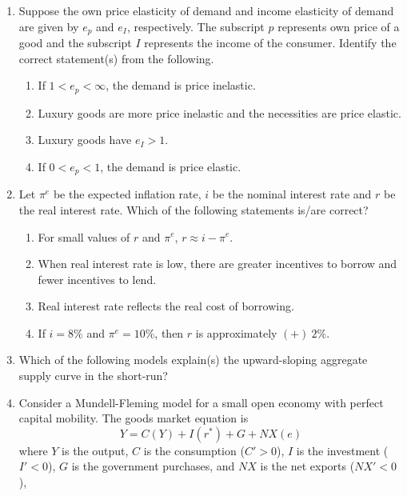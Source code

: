 \documentclass[12pt]{article}
\theoremstyle{remark}
\begin{document}
\begin{enumerate}
\item Suppose the own price elasticity of demand and income elasticity of demand are given by $e_p$ and $e_I$, respectively. The subscript $p$ represents own price of a good and the subscript $I$ represents the income of the consumer. Identify the correct statement(s) from the following. 
\begin{enumerate}
\item   If $1 < e_p < \infty$, the demand is price inelastic. 
\item   Luxury goods are more price inelastic and the necessities are price elastic. 
\item   Luxury goods have $e_I > 1$. 
\item   If $0 < e_p < 1$, the demand is price elastic. 
\end{enumerate}
\hfill{}
\item Let $\pi^e$ be the expected inflation rate, $i$ be the nominal interest rate and $r$ be the real interest rate. Which of the following statements is/are correct? 
\begin{enumerate} 
\item   For small values of $r$ and $\pi^e$, $r \approx i - \pi^e$. 
\item   When real interest rate is low, there are greater incentives to borrow and fewer incentives to lend. 
\item   Real interest rate reflects the real cost of borrowing. 
\item   If $i = 8\%$ and $\pi^e = 10\%$, then $r$ is approximately $(+)\ 2\%$. 
\end{enumerate}
\hfill{}
\item  Which of the following models explain(s) the upward-sloping aggregate supply curve in the short-run? 
\begin{enumerate}  \end{enumerate}
\hfill{}
\item   Consider a Mundell-Fleming model for a small open economy with perfect capital mobility. The goods market equation is $$Y = C(Y) + I(r^*) + G + NX(e)$$ where $Y$ is the output, $C$ is the consumption ($C' > 0$), $I$ is the investment ($I' < 0$), $G$ is the government purchases, and $NX$ is the net exports ($NX' < 0$), 

\end{enumerate}
\end{document}
